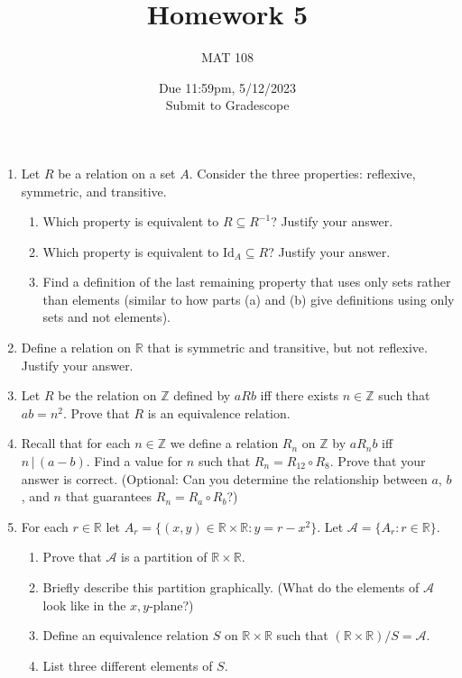 \documentclass{article}
\title{Homework 5}
\author{MAT 108}
\date{Due 11:59pm, 5/12/2023\\ 
\vspace{0.1cm}
Submit to Gradescope}
\newcommand{\bR}{\mathbb{R}}
\newcommand{\bZ}{\mathbb{Z}}
\begin{document}
\maketitle

{\large

\begin{enumerate}[labelindent=0pt,leftmargin=0pt]

    \setlength{\itemsep}{13pt} 

    \item Let $R$ be a relation on a set $A$. Consider the three properties: reflexive, symmetric, and transitive.\begin{enumerate}
    \item Which property is equivalent to $R\subseteq R^{-1}$? Justify your answer.
    \item Which property is equivalent to $\text{Id}_A\subseteq R$? Justify your answer.
    \item Find a definition of the last remaining property that uses only sets rather than elements (similar to how parts (a) and (b) give definitions using only sets and not elements). 
    \end{enumerate}
    

    \item Define a relation on $\bR$ that is symmetric and transitive, but not reflexive. Justify your answer.

    \item Let $R$ be the relation on $\bZ$ defined by $a R b$ iff there exists $n\in\bZ$ such that $ab=n^2$. Prove that $R$ is an equivalence relation.

    \item Recall that for each $n\in\bZ$ we define a relation $R_n$ on $\bZ$ by $a R_n b$ iff $n\,|\,(a-b)$. Find a value for $n$ such that $R_n=R_{12}\circ R_8$. Prove that your answer is correct. (Optional: Can you determine the relationship between $a$, $b$, and $n$ that guarantees $R_n=R_a\circ R_b$?)

    \item For each $r\in\bR$ let $A_r=\{(x,y)\in\bR\times\bR:y=r-x^2\}$. Let $\mathcal{A}=\{A_r:r\in\bR\}$.\begin{enumerate}
    \item Prove that $\mathcal{A}$ is a partition of $\bR\times\bR$.
    \item Briefly describe this partition graphically. (What do the elements of $\mathcal{A}$ look like in the $x,y$-plane?)
    \item Define an equivalence relation $S$ on $\bR\times\bR$ such that $(\bR\times\bR)/S=\mathcal{A}$.
    \item List three different elements of $S$.
    \end{enumerate}

    
    \end{enumerate}

}
\end{document}
